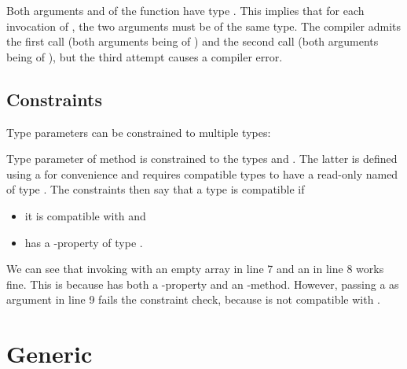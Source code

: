 \documentclass{haxe}
\begin{document}

Both arguments  and  of the  function have type . This implies that for each invocation of , the two arguments must be of the same type. The compiler admits the first call (both arguments being of ) and the second call (both arguments being of ), but the third attempt causes a compiler error.


\subsection{Constraints}
\label{type-system-type-parameter-constraints}

Type parameters can be constrained to multiple types:

Type parameter  of method  is constrained to the types  and . The latter is defined using a  for convenience and requires compatible types to have a read-only  named  of type . The constraints then say that a type is compatible if

\begin{itemize}
	\item it is compatible with  and
	\item has a -property of type .
\end{itemize}
We can see that invoking  with an empty array in line 7 and an  in line 8 works fine. This is because  has both a -property and an -method. However, passing a  as argument in line 9 fails the constraint check, because  is not compatible with . 


\section{Generic}
\label{type-system-generic}
\end{document}
